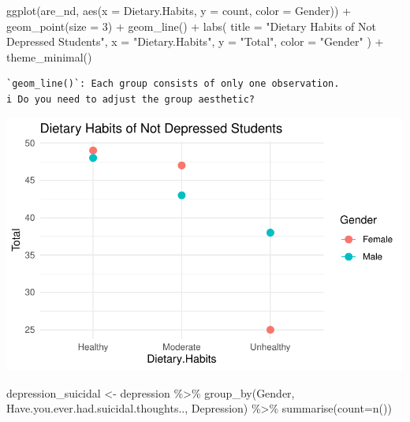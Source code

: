 \documentclass[
  letterpaper,
  DIV=11,
  numbers=noendperiod]{scrartcl}
\newenvironment{Shaded}{\begin{snugshade}}{\end{snugshade}}
\newcommand{\AttributeTok}[1]{\textcolor[rgb]{0.40,0.45,0.13}{#1}}
\newcommand{\DecValTok}[1]{\textcolor[rgb]{0.68,0.00,0.00}{#1}}
\newcommand{\FunctionTok}[1]{\textcolor[rgb]{0.28,0.35,0.67}{#1}}
\newcommand{\NormalTok}[1]{\textcolor[rgb]{0.00,0.23,0.31}{#1}}
\newcommand{\OtherTok}[1]{\textcolor[rgb]{0.00,0.23,0.31}{#1}}
\newcommand{\SpecialCharTok}[1]{\textcolor[rgb]{0.37,0.37,0.37}{#1}}
\newcommand{\StringTok}[1]{\textcolor[rgb]{0.13,0.47,0.30}{#1}}
\begin{document}
\begin{Shaded}
\begin{Highlighting}[]
\FunctionTok{ggplot}\NormalTok{(are\_nd, }\FunctionTok{aes}\NormalTok{(}\AttributeTok{x =}\NormalTok{ Dietary.Habits, }\AttributeTok{y =}\NormalTok{ count, }\AttributeTok{color =}\NormalTok{ Gender)) }\SpecialCharTok{+}
  \FunctionTok{geom\_point}\NormalTok{(}\AttributeTok{size =} \DecValTok{3}\NormalTok{) }\SpecialCharTok{+}    
  \FunctionTok{geom\_line}\NormalTok{() }\SpecialCharTok{+}       
  \FunctionTok{labs}\NormalTok{(}
    \AttributeTok{title =} \StringTok{"Dietary Habits of Not Depressed Students"}\NormalTok{,}
    \AttributeTok{x =} \StringTok{"Dietary.Habits"}\NormalTok{,}
    \AttributeTok{y =} \StringTok{"Total"}\NormalTok{,}
    \AttributeTok{color =} \StringTok{"Gender"}
\NormalTok{  ) }\SpecialCharTok{+}
  \FunctionTok{theme\_minimal}\NormalTok{() }
\end{Highlighting}
\end{Shaded}

\begin{verbatim}
`geom_line()`: Each group consists of only one observation.
i Do you need to adjust the group aesthetic?
\end{verbatim}

\includegraphics{Data_files/figure-pdf/unnamed-chunk-7-2.pdf}

\begin{Shaded}
\begin{Highlighting}[]
\NormalTok{depression\_suicidal }\OtherTok{\textless{}{-}}\NormalTok{ depression }\SpecialCharTok{\%\textgreater{}\%} \FunctionTok{group\_by}\NormalTok{(Gender, Have.you.ever.had.suicidal.thoughts.., Depression) }\SpecialCharTok{\%\textgreater{}\%} \FunctionTok{summarise}\NormalTok{(}\AttributeTok{count=}\FunctionTok{n}\NormalTok{())}
\end{Highlighting}
\end{Shaded}
\end{document}
